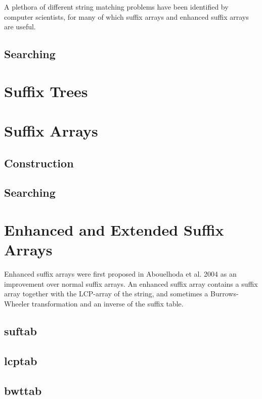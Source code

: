 \documentclass[a4paper,10pt]{article}
\begin{document}
A plethora of different string matching problems have been identified
by computer scientists, for many of which suffix arrays and enhanced
suffix arrays are useful.

\subsection*{Searching}


\section*{Suffix Trees}

\section*{Suffix Arrays}

\subsection*{Construction}

\subsection*{Searching}

\section*{Enhanced and Extended Suffix Arrays}

Enhanced suffix arrays were first proposed in Abouelhoda et al. 2004 as an
improvement over normal suffix arrays. An enhanced suffix array contains
a suffix array together with the LCP-array of the string, and sometimes
a Burrows-Wheeler transformation and an inverse of the suffix table.

\subsection*{suftab}

\subsection*{lcptab}

\subsection*{bwttab}
\end{document}
